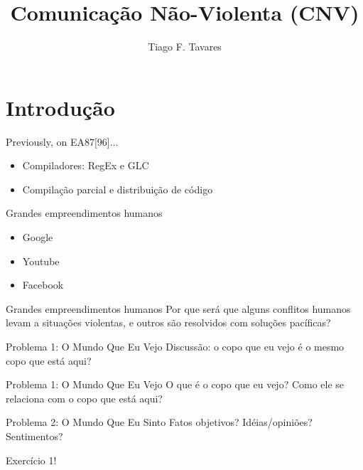 \documentclass{beamer}
\title[CNV]{Comunicação Não-Violenta (CNV)}
\author{Tiago F. Tavares}
\institute{FEEC -- UNICAMP}
\date{}
\begin{document}
\begin{frame}
  \titlepage
\end{frame}


\section{Introdução}

\begin{frame}[fragile]{Previously, on EA87[96]...}
  \centering
  \Large
  \begin{itemize}
    \item Compiladores: RegEx e GLC
    \item Compilação parcial e distribuição de código
  \end{itemize}
\end{frame}

\begin{frame}{Grandes empreendimentos humanos}
  \LARGE
  \begin{itemize}
    \item Google
    \item Youtube
    \item Facebook
  \end{itemize}
\end{frame}

\begin{frame}{Grandes empreendimentos humanos}
  \Large
  Por que será que alguns conflitos humanos levam a situações violentas, e
  outros são resolvidos com soluções pacíficas?
\end{frame}

\begin{frame}{Problema 1: O Mundo Que Eu Vejo}
  \Large
  Discussão: o copo que eu vejo é o mesmo copo que está aqui?
\end{frame}

\begin{frame}{Problema 1: O Mundo Que Eu Vejo}
  \Large
  O que é o copo que eu vejo? Como ele se relaciona com o copo que está aqui?
\end{frame}

\begin{frame}{Problema 2: O Mundo Que Eu Sinto}
  \Large
  Fatos objetivos? Idéias/opiniões? Sentimentos?


  Exercício 1!
\end{frame}
\end{document}
